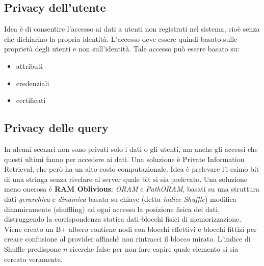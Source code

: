 \subsection{Privacy dell'utente}
Idea è di consentire l'accesso ai dati a utenti non registrati nel sistema, cioè senza che dichiarino la propria identità. L'accesso deve essere quindi basato sulle proprietà degli utenti e non sull'identità. Tale accesso può essere basato su:
\begin{itemize}
    \item attributi
    \item credenziali
    \item certificati
\end{itemize}
\subsection{Privacy delle query}
In alcuni scenari non sono privati solo i dati o gli utenti, ma anche gli accessi che questi ultimi fanno per accedere ai dati. Una soluzione è Private Information Retrieval, che però ha un alto costo computazionale. Idea è prelevare l'i-esimo bit di una stringa senza rivelare al server quale bit si sia prelevato. Una soluzione meno onerosa è \textbf{RAM Oblivious}: \textit{ORAM} e \textit{PathORAM}, basati su una struttura dati \textit{gerarchica} e \textit{dinamica} basata su chiave (detta \textit{indice Shuffle}) modifica dinamicamente (shuffling) ad ogni accesso la posizione fisica dei dati, distruggendo la corrispondenza statica dati-blocchi fisici di memorizzazione. Viene creato un B+ albero contiene nodi con blocchi effettivi e blocchi fittizi per creare confusione al provider affinchè non rintracci il blocco mirato. L'indice di Shuffle predispone $n$ ricerche false per non fare capire quale elemento si sia cercato veramente.
